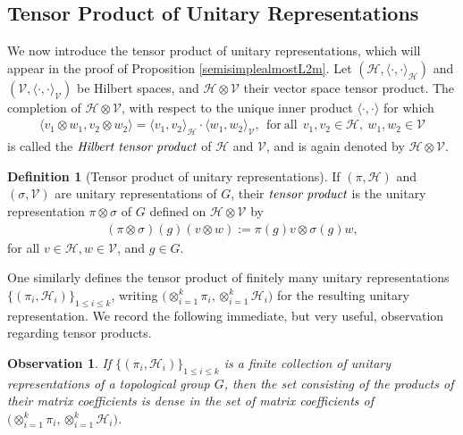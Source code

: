 \documentclass[psamsfonts]{amsart}
\newtheorem{obs}[thm]{Observation}
\theoremstyle{definition}
\newtheorem{defn}[thm]{Definition}
\theoremstyle{remark}
\numberwithin{equation}{section}
\begin{document}
\subsection{Tensor Product of Unitary Representations}
We now introduce the tensor product of unitary representations, which will appear in the proof of Proposition \ref{semisimplealmostL2m}. Let $(\mathcal{H}, \langle \cdot, \cdot \rangle_{\mathcal{H}})$ and $(\mathcal{V},  \langle \cdot, \cdot \rangle_{\mathcal{V}})$ be Hilbert spaces, and $\mathcal{H} \otimes \mathcal{V}$ their vector space tensor product. The completion of $\mathcal{H} \otimes \mathcal{V}$, with respect to the unique inner product $\langle \cdot, \cdot \rangle$ for which
\begin{align*}
\langle v_{1} \otimes w_{1}, v_{2} \otimes w_{2} \rangle = \langle v_{1}, v_{2} \rangle_{\mathcal{H}} \cdot \langle w_{1}, w_{2} \rangle_{\mathcal{V}}, \ \  \mathrm{for \ all} \ \ v_{1}, v_{2} \in \mathcal{H}, \ w_{1}, w_{2} \in \mathcal{V}
\end{align*} is called the $\emph{Hilbert tensor product}$ of $\mathcal{H}$ and $\mathcal{V}$, and is again denoted by $\mathcal{H} \otimes \mathcal{V}$.
\begin{defn} [Tensor product of unitary representations]
If $(\pi, \mathcal{H})$ and $(\sigma, \mathcal{V})$ are unitary representations of $G$, their $\emph{tensor product}$ is the unitary representation $\pi \otimes \sigma$ of $G$ defined on $\mathcal{H} \otimes \mathcal{V}$ by
\begin{align*}
(\pi \otimes \sigma)(g)(v \otimes w) := \pi(g)v \otimes \sigma(g)w,
\end{align*} for all $v \in \mathcal{H}, w \in \mathcal{V}$, and $g \in G$.
\end{defn} One similarly defines the tensor product of finitely many unitary representations $\{(\pi_{i}, \mathcal{H}_{i})\}_{1 \leq i \leq k}$, writing $\big( \otimes_{i=1}^{k} \pi_{i} , \otimes_{i=1}^{k} \mathcal{H}_{i} \big)$ for the resulting unitary representation. We record the following immediate, but very useful, observation regarding tensor products.
\begin{obs}
\label{densityofproductofcoeffs}
If $\{(\pi_{i}, \mathcal{H}_{i})\}_{1 \leq i \leq k}$ is a finite collection of unitary representations of a topological group $G$, then the set consisting of the products of their matrix coefficients is dense in the set of matrix coefficients of $\big( \otimes_{i=1}^{k} \pi_{i} , \otimes_{i=1}^{k} \mathcal{H}_{i} \big)$. 
\end{obs}
\end{document}
